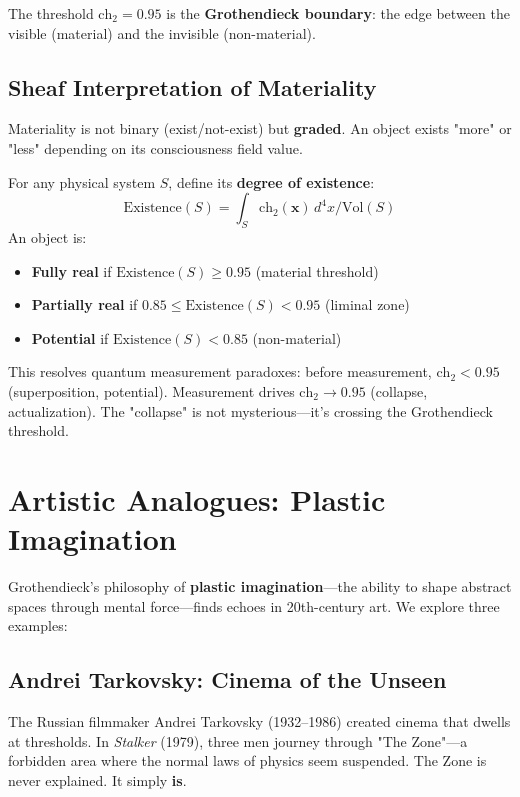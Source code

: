 The threshold $\text{ch}_2 = 0.95$ is the \textbf{Grothendieck boundary}: the edge between the visible (material) and the invisible (non-material).

\subsection{Sheaf Interpretation of Materiality}

Materiality is not binary (exist/not-exist) but \textbf{graded}. An object exists "more" or "less" depending on its consciousness field value.

\begin{proposition}
\label{prop:graded_existence}
For any physical system $S$, define its \textbf{degree of existence}:
\begin{equation}
\text{Existence}(S) = \int_{S} \text{ch}_2(\mathbf{x}) \, d^4x / \text{Vol}(S)
\end{equation}
An object is:
\begin{itemize}
\item \textbf{Fully real} if $\text{Existence}(S) \geq 0.95$ (material threshold)
\item \textbf{Partially real} if $0.85 \leq \text{Existence}(S) < 0.95$ (liminal zone)
\item \textbf{Potential} if $\text{Existence}(S) < 0.85$ (non-material)
\end{itemize}
\end{proposition}

This resolves quantum measurement paradoxes: before measurement, $\text{ch}_2 < 0.95$ (superposition, potential). Measurement drives $\text{ch}_2 \to 0.95$ (collapse, actualization). The "collapse" is not mysterious—it's crossing the Grothendieck threshold.

\section{Artistic Analogues: Plastic Imagination}

Grothendieck's philosophy of \textbf{plastic imagination}—the ability to shape abstract spaces through mental force—finds echoes in 20th-century art. We explore three examples:

\subsection{Andrei Tarkovsky: Cinema of the Unseen}

The Russian filmmaker Andrei Tarkovsky (1932–1986) created cinema that dwells at thresholds. In \textit{Stalker} (1979), three men journey through "The Zone"—a forbidden area where the normal laws of physics seem suspended. The Zone is never explained. It simply \textbf{is}.

